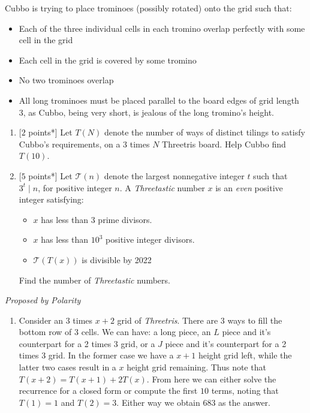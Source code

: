 \begin{enumerate}[align=left,start=1,label=\textbf{\textcolor{meablue}{Problem \arabic*}}]
        Cubbo is trying to place trominoes (possibly rotated) onto the grid such that:
        \begin {itemize}
        \item Each of the three individual cells in each tromino overlap perfectly with some cell in the grid
        \item Each cell in the grid is covered by some tromino
        \item No two trominoes overlap
        \item All long trominoes must be placed parallel to the board edges of grid length 3, as Cubbo, being very short, is jealous of the long tromino's height.
        \end {itemize}
        
    \begin{enumerate}
        \item {[$2$ points*]} Let $T(N)$ denote the number of ways of distinct tilings to satisfy Cubbo's requirements, on a 3 times $N$ Threetris board. Help Cubbo find $T(10)$.
        \item {[$5$ points*]} Let $\mathcal{T}(n)$ denote the largest nonnegative integer $t$ such that $3^t \mid n$, for positive integer $n$. A \emph{Threetastic} number $x$ is an \emph{even} positive integer satisfying:
        \begin{itemize}
            \item $x$ has less than 3 prime divisors. 
            \item $x$ has less than $10^3$ positive integer divisors. 
            \item $\mathcal{T}(T(x))$ is divisible by 2022
        \end{itemize}
        
        Find the number of \emph{Threetastic} numbers.
    \end{enumerate}

    \textrm{\emph{Proposed by Polarity}}

    \begin{solution}
        \begin{enumerate}
            \item Consider an 3 times $x + 2$ grid of \emph{Threetris}. There are 3 ways to fill the bottom row of 3 cells. We can have: a long piece, an $L$ piece and it's counterpart for a 2 times 3 grid, or a $J$ piece and it's counterpart for a 2 times 3 grid. In the former case we have a $x + 1$ height grid left, while the latter two cases result in a $x$ height grid remaining. Thus note that $T(x + 2) = T(x + 1) + 2 T(x)$. From here we can either solve the recurrence for a closed form or compute the first $10$ terms, noting that $T(1) = 1$ and $T(2) = 3$. Either way we obtain 683 as the answer. 
            

\end{enumerate}
\end{solution}
\end{enumerate}
